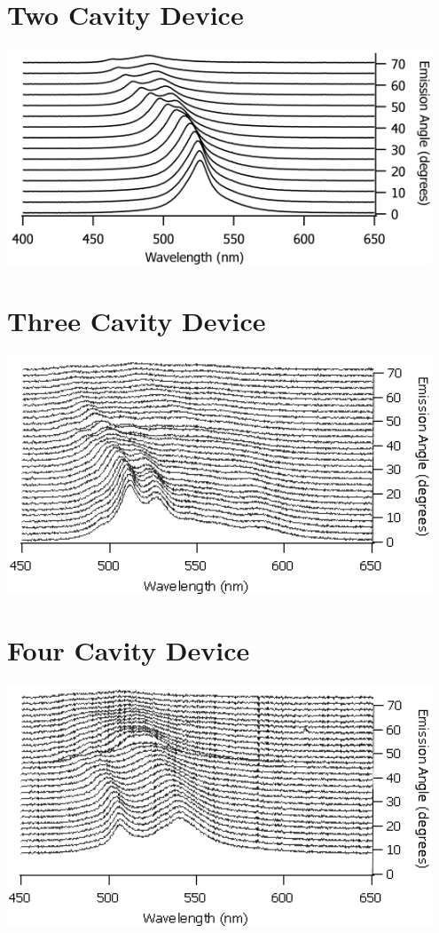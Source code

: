 \documentclass{report}
\begin{document}
    \section*{Two Cavity Device}
    \begin{center}
    \includegraphics[width=0.95\textwidth]{images/n2_waterfall.png}
    \end{center}
    
    \section*{Three Cavity Device}
    \begin{center}
    \includegraphics[width=0.95\textwidth]{images/n3_waterfall.png}
    \end{center}
    
    \section*{Four Cavity Device}
    \begin{center}
    \includegraphics[width=0.95\textwidth]{images/n4_waterfall.png}
    \end{center}
    
\end{document}
